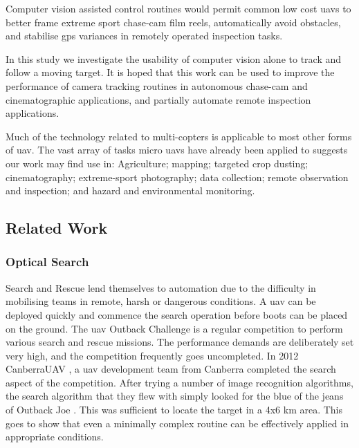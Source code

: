 \documentclass[a4paper, 11pt, titlepage]{article}
\begin{document}
      Computer vision assisted control routines would permit common low cost \glspl{uav} to better frame extreme sport chase-cam film reels, automatically avoid obstacles, and stabilise \gls{gps} variances in remotely operated inspection tasks.

      In this study we investigate the usability of computer vision alone to track and follow a moving target.  It is hoped that this work can be used to improve the performance of camera tracking routines in autonomous chase-cam and cinematographic applications, and partially automate remote inspection applications.

      Much of the technology related to multi-copters is applicable to most other forms of \gls{uav}.  The vast array of tasks micro \glspl{uav} have already been applied to suggests our work may find use in: Agriculture; mapping; targeted crop dusting; cinematography; extreme-sport photography; data collection; remote observation and inspection; and hazard and environmental monitoring.
    \subsection{Related Work}
      \subsubsection{Optical Search}
        Search and Rescue lend themselves to automation due to the difficulty in mobilising teams in remote, harsh or dangerous conditions.  A \gls{uav} can be deployed quickly and commence the search operation before boots can be placed on the ground.
        The \gls{uav} Outback Challenge \cite{OutbackChallenge} is a regular competition to perform various search and rescue missions.  The performance demands are deliberately set very high, and the competition frequently goes uncompleted.  
        In 2012 CanberraUAV \cite{canberrauav}, a \gls{uav} development team from Canberra completed the search aspect of the competition.
        After trying a number of image recognition algorithms, the search algorithm that they flew with simply looked for the blue of the jeans of Outback Joe \cite{tridge}. This was sufficient to locate the target in a 4x6 km area.  This goes to show that even a minimally complex routine can be effectively applied in appropriate conditions.
\end{document}
